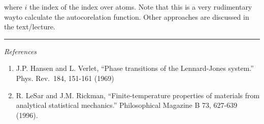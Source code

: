 \documentclass[11pt]{article}
\begin{document}
where \(i\) the index of the index over atoms. Note that this is a very
rudimentary wayto calculate the autocorelation function. Other
approaches are discussed in the text/lecture.

\begin{center}\rule{0.5\linewidth}{0.5pt}\end{center}

    \emph{References}

\begin{enumerate}
\def\labelenumi{\arabic{enumi}.}
\item
  J.P. Hansen and L. Verlet, ``Phase transitions of the Lennard-Jones
  system.'' Phys. Rev.~184, 151-161 (1969)
\item
  R. LeSar and J.M. Rickman, ``Finite-temperature properties of
  materials from analytical statistical mechanics.'' Philosophical
  Magazine B 73, 627-639 (1996).
\end{enumerate}


    
    
    
\end{document}
